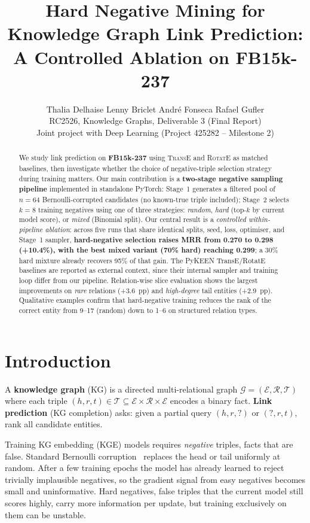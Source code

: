 \documentclass[10pt,twocolumn,letterpaper]{article}
\title{Hard Negative Mining for Knowledge Graph Link Prediction:\\
A Controlled Ablation on FB15k-237}
\author{
  Thalia Delhaise \quad Lenny Briclet \quad Andr\'e Fonseca \quad Rafael Gufler \\
  RC2526, Knowledge Graphs, Deliverable 3 (Final Report) \\
  Joint project with Deep Learning (Project 425282 -- Milestone 2)
}
\begin{document}
\maketitle

\begin{abstract}
We study link prediction on \textbf{FB15k-237} using \textsc{TransE} and
\textsc{RotatE} as matched baselines, then investigate whether the choice of
negative-triple selection strategy during training matters. Our main contribution
is a \textbf{two-stage negative sampling pipeline} implemented in standalone
PyTorch: Stage~1 generates a filtered pool of $n\!=\!64$ Bernoulli-corrupted
candidates (no known-true triple included); Stage~2 selects $k\!=\!8$ training
negatives using one of three strategies: \emph{random}, \emph{hard}
(top-$k$ by current model score), or \emph{mixed} (Binomial split).
Our central result is a \emph{controlled within-pipeline ablation}:
across five runs that share identical splits, seed, loss, optimiser, and
Stage~1 sampler, \textbf{hard-negative selection raises MRR from 0.270 to
0.298 (+10.4\%), with the best mixed variant (70\% hard) reaching 0.299};
a 30\% hard mixture already recovers 95\% of that gain. The PyKEEN
TransE/RotatE baselines are reported as external context, since their
internal sampler and training loop differ from our pipeline.
Relation-wise slice evaluation shows the largest improvements on
\emph{rare} relations (+3.6~pp) and \emph{high-degree} tail entities (+2.9~pp).
Qualitative examples confirm that hard-negative training reduces the rank of
the correct entity from 9--17 (random) down to 1--6 on structured relation types.
\end{abstract}

\section{Introduction}
\label{sec:intro}

A \textbf{knowledge graph} (KG) is a directed multi-relational graph
$\mathcal{G}=(\mathcal{E},\mathcal{R},\mathcal{T})$ where each triple
$(h,r,t)\in\mathcal{T}\subseteq\mathcal{E}\times\mathcal{R}\times\mathcal{E}$
encodes a binary fact. \textbf{Link prediction} (KG completion) asks: given a
partial query $(h,r,?)$ or $(?,r,t)$, rank all candidate entities.

Training KG embedding (KGE) models requires \emph{negative} triples, facts
that are false. Standard Bernoulli corruption~\cite{wang2014knowledge} replaces
the head or tail uniformly at random. After a few training epochs the model has
already learned to reject trivially implausible negatives, so the gradient signal
from easy negatives becomes small and uninformative. Hard negatives, false
triples that the current model still scores highly, carry more information per
update, but training exclusively on them can be unstable.
\end{document}
